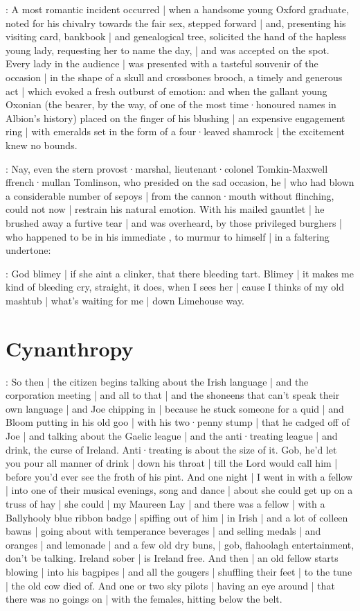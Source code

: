 :
A most romantic incident occurred |
when a handsome young Oxford graduate,
noted for his chivalry towards the fair sex,
stepped forward |
and,
presenting his visiting card,
bankbook |
and genealogical tree,
solicited the hand of the hapless young lady,
requesting her to name the day, |
and was accepted on the spot.
Every lady in the audience |
was presented with a tasteful souvenir of the occasion |
in the shape of a skull and crossbones brooch,
a timely and generous act |
which evoked a fresh outburst of emotion:
and when the gallant young Oxonian
(the bearer,
by the way,
of one of the most time·honoured names in Albion's history)
placed on the finger of his blushing  |
an expensive engagement ring |
with emeralds set in the form of a four·leaved shamrock |
the excitement knew no bounds.

:
Nay,
even the stern provost·marshal,
lieutenant·colonel Tomkin-Maxwell ffrench·mullan Tomlinson,
who presided on the sad occasion,
he |
who had blown a considerable number of sepoys |
from the cannon·mouth without flinching,
could not now |
restrain his natural emotion.
With his mailed gauntlet |
he brushed away a furtive tear |
and was overheard,
by those privileged burghers |
who happened to be in his immediate ,
to murmur to himself |
in a faltering undertone:

\tomlinson:
God blimey |
if she aint a clinker,
that there bleeding tart.
Blimey |
it makes me kind of bleeding cry,
straight,
it does,
when I sees her |
cause I thinks of my old mashtub |
what's waiting for me |
down Limehouse way.


\section{Cynanthropy}

\Nq:
So then |
the citizen begins talking about the Irish language |
and the corporation meeting
 |
and all to that |
and the shoneens that can't speak their own language |
and Joe chipping in |
because he stuck someone for a quid |
and Bloom putting in his old goo |
with his two·penny stump |
that he cadged off of Joe |
and talking about the Gaelic league |
and the anti·treating league |
and drink,
the curse of Ireland.
Anti·treating is about the size of it.
Gob,
he'd let you pour all manner of drink |
down his throat |
till the Lord would call him |
before you'd ever see the froth of his pint.
And one night |
I went in with a fellow |
into one of their musical evenings,
song and dance |
about she could get up on a truss of hay |
she could |
my Maureen Lay |
and there was a fellow |
with a Ballyhooly blue ribbon badge |
spiffing out of him |
in Irish |
and a lot of colleen bawns |
going about with temperance beverages
 |
and selling medals |
and oranges |
and lemonade |
and a few old dry buns, |
gob,
flahoolagh entertainment,
don't be talking.
Ireland sober |
is Ireland free.
And then |
an old fellow starts blowing |
into his bagpipes |
and all the gougers |
shuffling their feet |
to the tune |
the old cow died of.
And one or two sky pilots |
having an eye around |
that there was no goings on |
with the females,
hitting below the belt.

